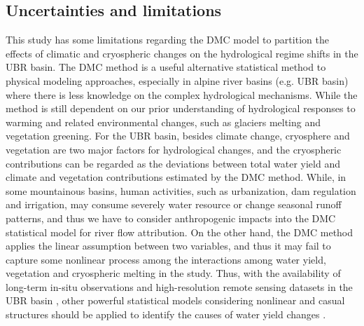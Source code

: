 \documentclass[hess, manuscript]{copernicus}
\begin{document}
\subsection{Uncertainties and limitations}
This study has some limitations regarding the DMC model to partition the effects of climatic and cryospheric changes on the hydrological regime shifts in the UBR basin. 
The DMC method is a useful alternative statistical method to physical modeling approaches, especially in alpine river basins (e.g. UBR basin) where there is less knowledge on the complex hydrological mechanisms.
While the method is still dependent on our prior understanding of hydrological responses to warming and related environmental changes, such as glaciers melting and vegetation greening. 
For the UBR basin, besides climate change, cryosphere \citep{biemans2019importance,yao2019recent} and vegetation \citep{li2021vegetation,li2019greening} are two major factors for hydrological changes, and the cryospheric contributions can be regarded as the deviations between total water yield and climate and vegetation contributions estimated by the DMC method.
While, in some mountainous basins, human activities, such as urbanization, dam regulation and irrigation, may consume severely water resource or change seasonal runoff patterns, and thus we have to consider anthropogenic impacts into the DMC statistical model for river flow attribution. 
On the other hand, the DMC method applies the linear assumption between two variables, and thus it may fail to capture some nonlinear process among the interactions among water yield, vegetation and cryospheric melting in the study. Thus, with the availability of long-term in-situ observations and high-resolution remote sensing datasets in the UBR basin \citep{wang2022observing}, other powerful statistical models considering nonlinear and casual structures should be applied to identify the causes of water yield changes \citep{runge2019inferring}.
\end{document}
